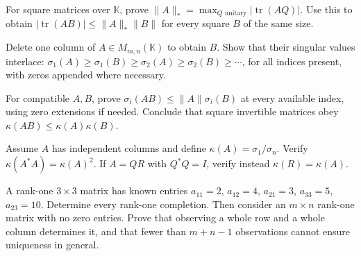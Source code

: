 \begin{exercise}[$\star\star$]\label{linear:ex:nuclear}
For square matrices over $\mathbb K$, prove
$\|A\|_*=\max_{Q\text{ unitary}}|\operatorname{tr}(AQ)|$.
Use this to obtain $|\operatorname{tr}(AB)|\le\|A\|_*\|B\|$ for every square $B$ of the same size.
\end{exercise}
\begin{exercise}[$\star\star$]\label{linear:ex:svinterlace}
Delete one column of $A\in M_{m,n}(\mathbb K)$ to obtain $B$. Show that their singular values interlace:
$\sigma_1(A)\ge\sigma_1(B)\ge\sigma_2(A)\ge\sigma_2(B)\ge\cdots$, for all indices present, with zeros appended where necessary.
\end{exercise}
\begin{exercise}[$\star\star$]\label{linear:ex:svprod}
For compatible $A,B$, prove $\sigma_i(AB)\le\|A\|\sigma_i(B)$ at every available index, using zero extensions if needed. Conclude that square invertible matrices obey $\kappa(AB)\le\kappa(A)\kappa(B)$.
\end{exercise}
\begin{exercise}[$\star\star$]\label{linear:ex:normal2x2}
Assume $A$ has independent columns and define $\kappa(A)=\sigma_1/\sigma_n$. Verify $\kappa(A^*A)=\kappa(A)^2$. If $A=QR$ with $Q^*Q=I$, verify instead $\kappa(R)=\kappa(A)$.
\end{exercise}
\begin{exercise}[$\star\star\star$]\label{linear:ex:matrixcompletion}
A rank-one $3\times3$ matrix has known entries $a_{11}=2$, $a_{12}=4$, $a_{21}=3$, $a_{33}=5$, $a_{23}=10$. Determine every rank-one completion. Then consider an $m\times n$ rank-one matrix with no zero entries. Prove that observing a whole row and a whole column determines it, and that fewer than $m+n-1$ observations cannot ensure uniqueness in general.
\end{exercise}

